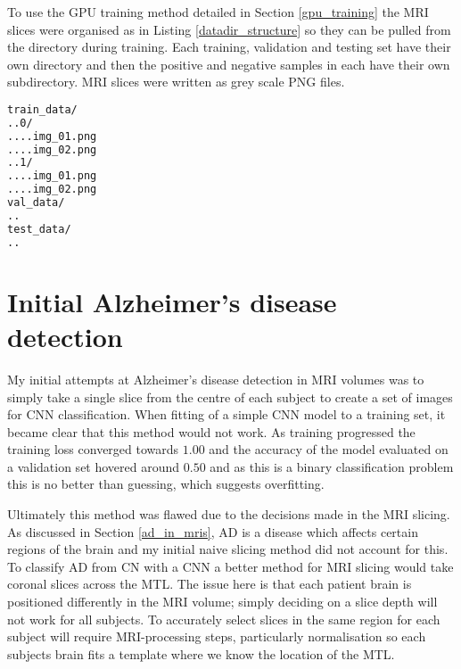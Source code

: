\documentclass[
    author={Kai Hulme},
    supervisor={Dr Jon Bird},
    degree={BSc},
    title={Generative Adversarial Networks as an Augmentation Technique},
    subtitle={for Alzheimer's Disease Detection in MRI Volumes},
    type={Research},
    year={2021} 
]{dissertation}
\begin{document}
To use the GPU training method detailed in Section \ref{gpu_training} the MRI slices were organised as in Listing \ref{datadir_structure} so they can be pulled from the directory during training. Each training, validation and testing set have their own directory and then the positive and negative samples in each have their own subdirectory. MRI slices were written as grey scale PNG files.

\begin{lstlisting}[float={t},language=Bash, caption={Required data directory structure for Keras \textit{image\_dataset\_from\_directory}}, label={datadir_structure}]
train_data/
..0/
....img_01.png
....img_02.png
..1/
....img_01.png
....img_02.png
val_data/
..
test_data/
..
\end{lstlisting}
	
	
\section{Initial Alzheimer's disease detection}
\label{initial_ad_detection}

My initial attempts at Alzheimer's disease detection in MRI volumes was to simply take a single slice from the centre of each subject to create a set of images for CNN classification. When fitting of a simple CNN model to a training set, it became clear that this method would not work. As training progressed the training loss converged towards $1.00$ and the accuracy of the model evaluated on a validation set hovered around $0.50$ and as this is a binary classification problem this is no better than guessing, which suggests overfitting. 

Ultimately this method was flawed due to the decisions made in the MRI slicing. As discussed in Section \ref{ad_in_mris}, AD is a disease which affects certain regions of the brain and my initial naive slicing method did not account for this. \\

To classify AD from CN with a CNN a better method for MRI slicing would take coronal slices across the MTL. The issue here is that each patient brain is positioned differently in the MRI volume; simply deciding on a slice depth will not work for all subjects. To accurately select slices in the same region for each subject will require MRI-processing steps, particularly normalisation so each subjects brain fits a template where we know the location of the MTL.
	
\end{document}
